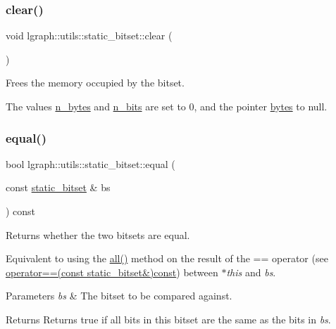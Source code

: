 \subsubsection{\texorpdfstring{clear()}{clear()}}
{\footnotesize\ttfamily void lgraph\+::utils\+::static\+\_\+bitset\+::clear (\begin{DoxyParamCaption}{ }\end{DoxyParamCaption})}



Frees the memory occupied by the bitset. 

The values \hyperlink{classlgraph_1_1utils_1_1static__bitset_aa3f7a6d10e41df757ca86e3636cb85d4}{n\+\_\+bytes} and \hyperlink{classlgraph_1_1utils_1_1static__bitset_aebc02986838d70f13d3c10f390d11211}{n\+\_\+bits} are set to 0, and the pointer \hyperlink{classlgraph_1_1utils_1_1static__bitset_a56d277fc22bbf71a27fca530a133c9bd}{bytes} to null. \mbox{\label{classlgraph_1_1utils_1_1static__bitset_ace2e45ef0ed9d26bab0153c32dd4a74e}} 
\subsubsection{\texorpdfstring{equal()}{equal()}}
{\footnotesize\ttfamily bool lgraph\+::utils\+::static\+\_\+bitset\+::equal (\begin{DoxyParamCaption}\item[{const \hyperlink{classlgraph_1_1utils_1_1static__bitset}{static\+\_\+bitset} \&}]{bs }\end{DoxyParamCaption}) const}



Returns whether the two bitsets are equal. 

Equivalent to using the \hyperlink{classlgraph_1_1utils_1_1static__bitset_a6092b3d92a70408db6cf67348277eedc}{all()} method on the result of the \textquotesingle{}==\textquotesingle{} operator (see \hyperlink{classlgraph_1_1utils_1_1static__bitset_a901bec6cc27e6b521d33b8658223e1ea}{operator==(const static\+\_\+bitset\&)const}) between {\itshape $\ast$this} and {\itshape bs}.


\begin{DoxyParams}{Parameters}
{\em bs} & The bitset to be compared against. \\
\hline
\end{DoxyParams}
\begin{DoxyReturn}{Returns}
Returns true if all bits in this bitset are the same as the bits in {\itshape bs}. 
\end{DoxyReturn}
\mbox{\label{classlgraph_1_1utils_1_1static__bitset_a430b19330c6f2a77f6ee15c3d652a2d6}} 
